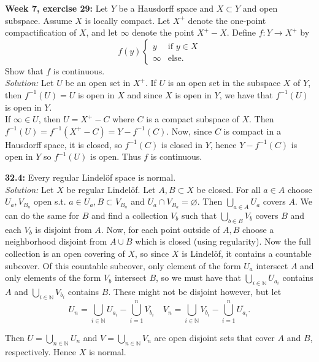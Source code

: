 \documentclass[a4paper]{article}
\begin{document}
        \textbf{Week 7, exercise 29:} Let $Y$ be a Hausdorff space and $X
        \subset Y$ and open subspace. Assume $X$ is locally compact. Let
        $X^{+}$ denote the one-point compactification of $X$, and let $\infty$ 
        denote the point $X^{+}-X$. Define $f \colon Y\to X^{+}$ by
        \[
        f(y) \begin{cases}
            y& \text{if } y \in X\\
            \infty & \text{else}.
        \end{cases}
        \] 
        Show that  $f$ is continuous.\\
        \textit{Solution:} Let $U$ be an open set in $X^{+}$. If
        $U$ is an open set in the subspace $X$ of $Y$, then $f^{-1}(U) = U$ is
        open in $X$ and since $X$ is open in $Y$, we have that $f^{-1}(U)$ is
        open in $Y$.\\
        If $\infty \in U$, then $U = X^{+} - C$ where $C$ is a compact subspace
        of $X$. Then
        $f^{-1}\left( U \right) = f^{-1}\left( X^{+} - C \right) 
        = Y - f^{-1}(C)$. Now, since $C$ is compact in a Hausdorff space, it is
        closed, so $f^{-1}(C)$ is closed in $Y$, hence $Y- f^{-1}(C)$ is open
        in $Y$ so $f^{-1}(U)$ is open. Thus $f$ is continuous.\\
        \linebreak
        
        


        \textbf{32.4:} Every regular Lindelöf space is normal.\\
        \linebreak
        \textit{Solution:}
        Let $X$ be regular Lindelöf. Let $A,B \subset X$ be closed.
        For all $a \in A$ choose $U_a, V_{B_a}$ open s.t. $a \in U_a, B \subset
        V_{B_a}$ and $U_a \cap V_{B_a} = \varnothing$. Then
        $\bigcup_{a \in A} U_a$ covers $A$. We can do the same for
        $B$ and find a collection $V_b$ such that $\bigcup_{b \in B} V_b$ 
        covers $B$ and each $V_b$ is disjoint from $A$. Now,
        for each point outside of $A,B$ choose a neighborhood disjoint from
        $A\cup B$ which is closed (using regularity). Now the full collection
        is an open covering of $X$, so since $X$ is Lindelöf, it contains
        a countable subcover. Of this countable subcover, only element of the
        form $U_a$ intersect $A$ and only elements of the form $V_b$ intersect
        $B$, so we must have that $\bigcup_{i \in \mathbb{N}} U_{a_i}$ contains
        $A$ and $\bigcup_{i \in \mathbb{N}} V_{b_{i}}$ contains $B$. These
        might not be disjoint however, but let
        \[U_n = \bigcup_{i \in \mathbb{N}} U_{a_i} - \bigcup_{i = 1}^{n}
        \overline{V_{b_i}} \quad
    V_n = \bigcup_{i \in \mathbb{N}} V_{b_i}- \bigcup_{i=1}^{n}
\overline{U_{a_i}}. \]

Then $U = \bigcup_{n \in \mathbb{N}} U_n$ and $V = \bigcup_{n \in \mathbb{N}}
V_n$ are open disjoint sets that cover $A$ and $B$, respectively. Hence $X$ is
normal.
\end{document}

